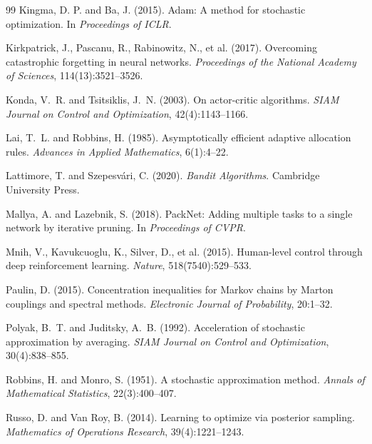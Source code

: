 \documentclass[12pt,a4paper]{article}
\begin{document}
\begin{thebibliography}{99}
Kingma, D. P. and Ba, J. (2015).
\newblock Adam: A method for stochastic optimization.
\newblock In \emph{Proceedings of ICLR}.

Kirkpatrick, J., Pascanu, R., Rabinowitz, N., et al. (2017).
\newblock Overcoming catastrophic forgetting in neural networks.
\newblock \emph{Proceedings of the National Academy of Sciences},
  114(13):3521--3526.

Konda, V.~R. and Tsitsiklis, J.~N. (2003).
\newblock On actor-critic algorithms.
\newblock \emph{SIAM Journal on Control and Optimization}, 42(4):1143--1166.

Lai, T.~L. and Robbins, H. (1985).
\newblock Asymptotically efficient adaptive allocation rules.
\newblock \emph{Advances in Applied Mathematics}, 6(1):4--22.

Lattimore, T. and Szepesv\'{a}ri, C. (2020).
\newblock \emph{Bandit Algorithms}.
\newblock Cambridge University Press.

Mallya, A. and Lazebnik, S. (2018).
\newblock PackNet: Adding multiple tasks to a single network by iterative
  pruning.
\newblock In \emph{Proceedings of CVPR}.

Mnih, V., Kavukcuoglu, K., Silver, D., et al. (2015).
\newblock Human-level control through deep reinforcement learning.
\newblock \emph{Nature}, 518(7540):529--533.

Paulin, D. (2015).
\newblock Concentration inequalities for Markov chains by Marton couplings and
  spectral methods.
\newblock \emph{Electronic Journal of Probability}, 20:1--32.

Polyak, B.~T. and Juditsky, A.~B. (1992).
\newblock Acceleration of stochastic approximation by averaging.
\newblock \emph{SIAM Journal on Control and Optimization}, 30(4):838--855.

Robbins, H. and Monro, S. (1951).
\newblock A stochastic approximation method.
\newblock \emph{Annals of Mathematical Statistics}, 22(3):400--407.

Russo, D. and Van Roy, B. (2014).
\newblock Learning to optimize via posterior sampling.
\newblock \emph{Mathematics of Operations Research}, 39(4):1221--1243.


\end{thebibliography}
\end{document}
